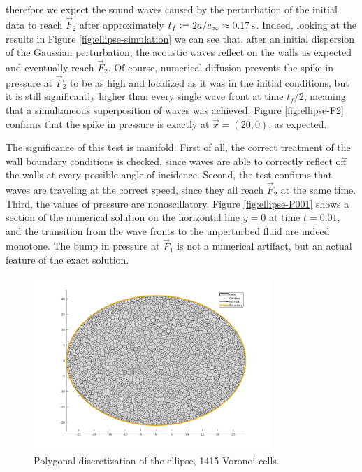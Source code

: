 therefore we expect the sound waves caused by the perturbation
of the initial data to reach $\vec{F}_2$ after approximately
$t_f \vcentcolon= 2a/c_\infty \approx \SI{0.17}{\second}$.
Indeed, looking at the results in Figure \ref{fig:ellipse-simulation}
we can see that, after an initial dispersion of the Gaussian perturbation,
the acoustic waves reflect on the walls as expected and eventually
reach $\vec{F}_2$.
Of course, numerical diffusion prevents the spike in pressure
at $\vec{F}_2$ to be as high and localized as it was in the initial
conditions, but it is still significantly higher than every single
wave front at time $t_f/2$, meaning that a simultaneous superposition
of waves was achieved. Figure \ref{fig:ellipse-F2} confirms that the spike
in pressure is exactly at $\vec{x} = (20,0)$, as expected.

The significance of this test is manifold. First of all, the correct
treatment of the wall boundary conditions is checked, since waves
are able to correctly reflect off the walls at every possible angle
of incidence.
Second, the test confirms that waves are traveling at the correct speed,
since they all reach $\vec{F}_2$ at the same time.
Third, the values of pressure are nonoscillatory. Figure
\ref{fig:ellipse-P001} shows a section of the numerical solution
on the horizontal line $y = 0$ at time $t = 0.01$,
and the transition from the wave fronts to the unperturbed fluid
are indeed monotone.
The bump in pressure at $\vec{F}_1$ is not a numerical artifact,
but an actual feature of the exact solution.

\begin{figure}[tbp]
\centering
\includegraphics[width=0.8\textwidth]{ellipse2500.png}
\caption{Polygonal discretization of the ellipse, 1415 Voronoi cells.}
\label{fig:ellipse-2500}
\end{figure}

